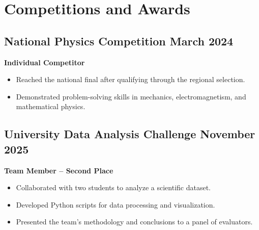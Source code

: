 \documentclass[11pt]{article}
\begin{document}

\section{
    \texorpdfstring{
    \makebox[\widthof{\faTrophy}][c]{
        \color{NA_Red}{\faTrophy}
    }\quad Competitions and Awards
    }
    {
    Competitions and Awards
    }
}

\subsection{
    \texorpdfstring{
    National Physics Competition
    \hfill March 2024
    }
    {National Physics Competition
    -- March 2024}
}

\textbf{Individual Competitor}

\begin{itemize}
    \item Reached the national final after qualifying through
    the regional selection.
    \item Demonstrated problem-solving skills in mechanics,
    electromagnetism, and mathematical physics.
\end{itemize}

\subsection{
    \texorpdfstring{
    University Data Analysis Challenge
    \hfill November 2025
    }
    {University Data Analysis Challenge
    -- November 2025}
}

\textbf{Team Member -- Second Place}

\begin{itemize}
    \item Collaborated with two students to analyze a scientific dataset.
    \item Developed Python scripts for data processing and visualization.
    \item Presented the team's methodology and conclusions to a panel
    of evaluators.
\end{itemize}



\CVNewPage
\end{document}
